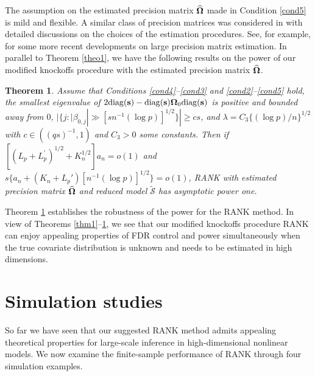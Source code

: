 \documentclass[11pt]{article}
\newtheorem{theorem}{Theorem}%
\newcommand{\bs}{\mbox{\bf s}}
\newcommand{\bOmg}{\mbox{\boldmath $\Omega$}}
\newcommand{\wt}{\widetilde}
\newcommand{\wh}{\widehat}
\newcommand{\diag}{\mathrm{diag}}
\begin{document}
The assumption on the estimated precision matrix $\wh{\bOmg}$ made in Condition \ref{cond5} is mild and flexible. A similar class of precision matrices was considered in \cite{FanKongLiZheng2015} with detailed discussions on the choices of the estimation procedures. See, for example, \cite{FanLv2016, ChenRenZhaoZhou2016} for some more recent developments on large precision matrix estimation. In parallel to Theorem \ref{theo1}, we have the following results on the power of our modified knockoffs procedure with the estimated precision matrix $\wh{\bOmg}$.

\begin{theorem} \label{theo2}
Assume that Conditions \ref{cond4}--\ref{cond3} and \ref{cond2}--\ref{cond5} hold, the smallest eigenvalue of $2\diag(\bs) - \diag(\bs)\bOmg_0\diag(\bs)$ is positive and bounded away from $0$, $|\{j: |\beta_{0,j}|\gg [sn^{-1}(\log p)]^{1/2}\}| \geq cs$, and $\lambda =  C_3 \{(\log p)/n\}^{1/2}$ with $ c  \in ((qs)^{-1},1)$ and $C_3>0$ some constants. Then if $[(L_p + L_p^{\prime})^{1/2}+K_n^{1/2}] a_n = o(1)$ and $s \{a_n + (K_n+L_{p}') [n^{-1}(\log p)]^{1/2} \} = o(1)$, \emph{RANK} with estimated precision matrix $\wh{\bOmg}$ and reduced model $\wt{\mathcal S}$ has asymptotic power one.
\end{theorem}

Theorem \ref{theo2} establishes the robustness of the power for the RANK method. In view of Theorems \ref{thm1}--\ref{theo2}, we see that our modified knockoffs procedure RANK can enjoy appealing properties of FDR control and power simultaneously when the true covariate distribution is unknown and needs to be estimated in high dimensions.


\section{Simulation studies} \label{sec4}
So far we have seen that our suggested RANK method admits appealing theoretical properties for large-scale inference in high-dimensional nonlinear models. %
We now examine the finite-sample performance of RANK through four simulation examples.
\end{document}
